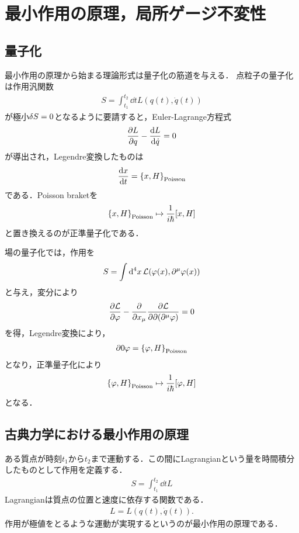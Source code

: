 	\section{最小作用の原理，局所ゲージ不変性}
	\subsection{量子化}
	最小作用の原理から始まる理論形式は量子化の筋道を与える．
	点粒子の量子化は作用汎関数
	\begin{align}
			S = \int _{t_1}^{t_2} \dd{t} L(q(t), \dot{q}(t))
	\end{align}
	が極小$\var{S} = 0$となるように要請すると，Euler-Lagrange方程式
	\begin{align}
			\pdv{L}{q} - \dv{L}{\dot{q}} = 0
	\end{align}
	が導出され，Legendre変換したものは
	\begin{align}
			\dv{x}{t} = \qty{x, H}_{\text{Poisson}}
	\end{align}
	である．Poisson braketを
	\begin{align}
			\qty{x, H} _{\text{Poisson}} \mapsto \frac{1}{i\hbar}\qty[x, H]
	\end{align}
	と置き換えるのが正準量子化である．

	場の量子化では，作用を
	\begin{align}
			S = \int\dd[4]{x}\mathcal{L}(\varphi(x), \partial ^{\mu} \varphi(x))
	\end{align}
	と与え，変分により
	\begin{align}
			\pdv{\mathcal{L}}{\varphi} - \pdv{}{x_{\mu}}\pdv{\mathcal{L}}{\partial(\partial^{\mu}\varphi)} = 0
	\end{align}
	を得，Legendre変換により，
	\begin{align}
			\partial {0} \varphi = \qty{\varphi, H}_{\text{Poisson}}
	\end{align}
	となり，正準量子化により
	\begin{align}
			\qty{\varphi, H}_{\text{Poisson}}\mapsto \frac{1}{i\hbar} [\varphi, H]
	\end{align}
	となる．

	\subsection{古典力学における最小作用の原理}
	ある質点が時刻$t_1$から$t_2$まで運動する．この間にLagrangianという量を時間積分したものとして作用を定義する．
	\begin{align}
			S = \int_{t_1}^{t_2}\dd{t}L
	\end{align}
	Lagrangianは質点の位置と速度に依存する関数である．
	\begin{align}
			L = L(q(t), \dot{q}(t)).
	\end{align}
	作用が極値をとるような運動が実現するというのが最小作用の原理である．
	

